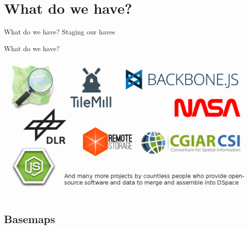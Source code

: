\documentclass{beamer}
\begin{document}
\section{What do we have?}

\begin{frame}{What do we have?}
 Staging our haves
\end{frame}

\begin{frame}{What do we have?}
 \begin{center}
  \vspace{0.8em}
  \includegraphics[scale=0.281]{images/logos}
 \end{center}
\end{frame}


\subsection{Basemaps}
\end{document}
